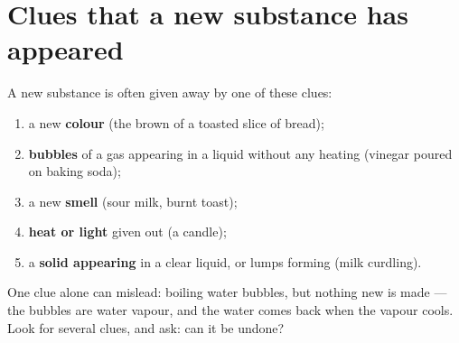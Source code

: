 \section{Clues that a new substance has appeared}

\begin{method}\label{met:g5:irreversible-changes:clues}
A new substance is often given away by one of these clues:
\begin{enumerate}
  \item a new \textbf{colour} (the brown of a toasted slice of bread);
  \item \textbf{bubbles} of a gas appearing in a liquid without any
        heating (vinegar poured on baking soda);
  \item a new \textbf{smell} (sour milk, burnt toast);
  \item \textbf{heat or light} given out (a  candle);
  \item a \textbf{solid appearing} in a clear liquid, or lumps forming
        (milk curdling).
\end{enumerate}
One clue alone can mislead: boiling water bubbles, but nothing new is
made --- the bubbles are water vapour, and the water comes back when the
vapour cools. Look for several clues, and ask: can it be undone?
\end{method}

